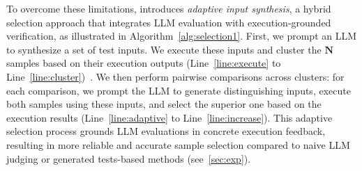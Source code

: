 

To overcome these limitations, \frameworkname introduces \emph{adaptive input synthesis}, a hybrid selection approach that integrates LLM evaluation with execution-grounded verification, as illustrated in Algorithm~\ref{alg:selection1}. First, we prompt an LLM to synthesize a set of test inputs. We execute these inputs and cluster the $\mathbf{N}$ samples based on their execution outputs (Line~\ref{line:execute} to Line~\ref{line:cluster})~\citep{li2022competition}. We then perform pairwise comparisons across clusters: for each comparison, we prompt the LLM to generate distinguishing inputs, execute both samples using these inputs, and select the superior one based on the execution results (Line~\ref{line:adaptive} to Line~\ref{line:increase}). This adaptive selection process grounds LLM evaluations in concrete execution feedback, resulting in more reliable and accurate sample selection compared to naive LLM judging or generated tests-based methods (see~\cref{sec:exp}).





\begin{table*}[!t]
\centering
\renewcommand{\arraystretch}{1.2}
\setlength{\tabcolsep}{6pt}
\caption{\textbf{Pass@1 of zero-shot, majority voting~\citep{wang2022self, li2022competition}, self-debugging~\citep{chen2023teaching}, and \frameworkname on LiveCodeBench (v2)}. Bold text denotes the best performance. "R1-Distill", "QwQ", "4o-mini" is short for "DeepSeek-R1-Distill-Qwen"~\citep{guo2025deepseek}, "QwQ-32B-Preview"~\citep{qwen_qwq_2024}, and "GPT-4o-mini"~\citep{achiam2023gpt} respectively. \textit{\frameworkname consistently outperforms other baselines.}}\label{tab:exp_diff_strategies}
\end{table*}